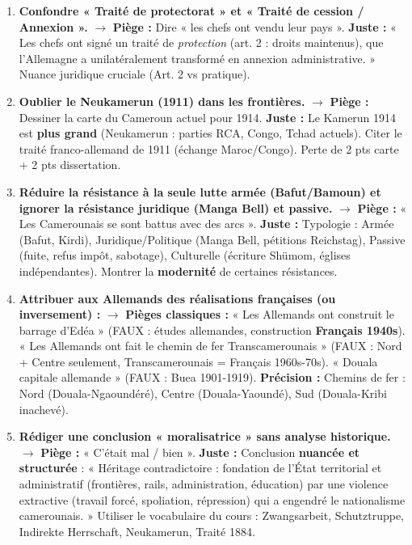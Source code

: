 \documentclass[11pt]{article}
\newcommand{\cle}[1]{{\popxbold\color{popdark}#1}}
\begin{document}
\begin{attention}
\begin{enumerate}
    \item \textbf{Confondre « Traité de protectorat » et « Traité de cession / Annexion ».} $\rightarrow$ \textbf{Piège :} Dire « les chefs ont vendu leur pays ». \textbf{Juste :} « Les chefs ont signé un traité de \emph{protection} (art. 2 : droits maintenus), que l'Allemagne a unilatéralement transformé en annexion administrative. » Nuance juridique cruciale (Art. 2 vs pratique).
    \item \textbf{Oublier le \cle{Neukamerun} (1911) dans les frontières.} $\rightarrow$ \textbf{Piège :} Dessiner la carte du Cameroun actuel pour 1914. \textbf{Juste :} Le Kamerun 1914 est \textbf{plus grand} (Neukamerun : parties RCA, Congo, Tchad actuels). Citer le traité franco-allemand de 1911 (échange Maroc/Congo). Perte de 2 pts carte + 2 pts dissertation.
    \item \textbf{Réduire la résistance à la seule lutte armée (Bafut/Bamoun) et ignorer la résistance juridique (Manga Bell) et passive.} $\rightarrow$ \textbf{Piège :} « Les Camerounais se sont battus avec des arcs ». \textbf{Juste :} Typologie : Armée (Bafut, Kirdi), Juridique/Politique (Manga Bell, pétitions Reichstag), Passive (fuite, refus impôt, sabotage), Culturelle (écriture Shümom, églises indépendantes). Montrer la \textbf{modernité} de certaines résistances.
    \item \textbf{Attribuer aux Allemands des réalisations françaises (ou inversement) :} $\rightarrow$ \textbf{Pièges classiques :} « Les Allemands ont construit le barrage d'Edéa » (FAUX : études allemandes, construction \textbf{Français 1940s}). « Les Allemands ont fait le chemin de fer Transcamerounais » (FAUX : Nord + Centre seulement, Transcamerounais = Français 1960s-70s). « Douala capitale allemande » (FAUX : Buea 1901-1919). \textbf{Précision :} Chemins de fer : Nord (Douala-Ngaoundéré), Centre (Douala-Yaoundé), Sud (Douala-Kribi inachevé).
    \item \textbf{Rédiger une conclusion « moralisatrice » sans analyse historique.} $\rightarrow$ \textbf{Piège :} « C'était mal / bien ». \textbf{Juste :} Conclusion \textbf{nuancée et structurée} : « Héritage contradictoire : fondation de l'État territorial et administratif (frontières, rails, administration, éducation) par une violence extractive (travail forcé, spoliation, répression) qui a engendré le nationalisme camerounais. » Utiliser le vocabulaire du cours : \cle{Zwangsarbeit}, \cle{Schutztruppe}, \cle{Indirekte Herrschaft}, \cle{Neukamerun}, \cle{Traité 1884}.
\end{enumerate}
\end{attention}
\end{document}
